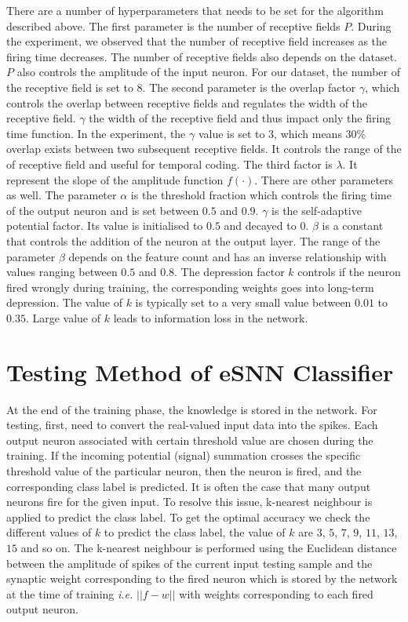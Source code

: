 There are a number of hyperparameters that needs to be set for the algorithm described above. The first parameter is the number of receptive fields $P$. During the experiment, we observed that the number of receptive field increases as the firing time decreases. The number of receptive fields also depends on the dataset. $P$ also controls the amplitude of the input neuron. For our dataset, the number of the receptive field is set to $8$. The second parameter is the overlap factor $\gamma$, which controls the overlap between receptive fields and regulates the width of the receptive field. $\gamma$ the width of the receptive field and thus impact only the firing time function. In the experiment, the $\gamma$ value is set to $3$, which means $30\%$ overlap exists between two subsequent receptive fields. It controls the range of the of receptive field and useful for temporal coding. The third factor is $\lambda$. It represent the slope of the amplitude function $f(\cdot)$. There are other parameters as well. The parameter $\alpha$ is the threshold fraction which controls the firing time of the output neuron and is set between $0.5$ and $0.9$. $\gamma$ is the self-adaptive potential factor. Its value is initialised to $0.5$ and decayed to $0$. $\beta$ is a constant that controls the addition of the neuron at the output layer. The range of the parameter $\beta$ depends on the feature count and has an inverse relationship with values ranging between $0.5$ and $0.8$. The depression factor $k$ controls if the neuron fired wrongly during training, the corresponding weights goes into long-term depression. The value of $k$ is typically set to a very small value between $0.01$ to $0.35$. Large value of $k$ leads to information loss in the network.

\section{Testing Method of eSNN Classifier}

At the end of the training phase, the knowledge is stored in the network. For testing, first, need to convert the real-valued input data into the spikes. Each output neuron associated with certain threshold value are chosen during the training. If the incoming potential (signal) summation crosses the specific threshold value of the particular neuron, then the neuron is fired, and the corresponding class label is predicted. It is often the case that many output neurons fire for the given input. To resolve this issue, k-nearest neighbour is applied to predict the class label. To get the optimal accuracy we check the different values of $k$ to predict the class label, the value of $k$ are $3$, $5$, $7$, $9$, $11$, $13$, $15$ and so on. The k-nearest neighbour is performed using the Euclidean distance between the amplitude of spikes of the current input testing sample and the synaptic weight corresponding to the fired neuron which is stored by the network at the time of training \emph{i.e.} $|| f - w ||$ with weights corresponding to each fired output neuron.


